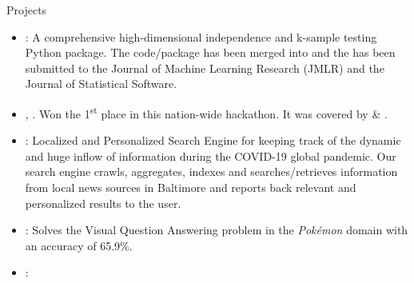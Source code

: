 \documentclass[]{mcdowellcv}
\begin{document}
	\begin{cvsection}{Projects}
		\begin{cvsubsection}{}{}{}
			\begin{itemize}
				\item \textbf{\href{https://github.com/neurodata/mgcpy}{}}: A comprehensive high-dimensional independence and k-sample testing Python package. The code/package has been merged into \href{https://github.com/scipy/scipy/pull/10524}{} and the \href{https://arxiv.org/abs/1907.02088}{} has been submitted to the Journal of Machine Learning Research (JMLR) and the Journal of Statistical Software.
				\item \textbf{\href{https://www.youtube.com/watch?v=iWw4_Ub2lPw&feature=youtu.be}{}}, \href{https://www.facebook.com/gtuoffice/videos/1786668221397028/?t=8798}{{}}. Won the 1\textsuperscript{st} place in this nation-wide hackathon. 
				It was covered by \href{https://www.thehindu.com/todays-paper/tp-national/tp-tamilnadu/5-teams-from-ssn-college-win-prizes/article23461319.ece}{{}} \& \href{https://timesofindia.indiatimes.com/city/ahmedabad/six-winners-emerge-from-smart-india-hackathon/articleshow/63561717.cms?utm_source=whatsapp&utm_medium=social&utm_campaign=TOIMobile}{{}}.
				\item \textbf{\href{https://github.com/tpsatish95/covid19-search-engine}{}}: Localized and Personalized Search Engine for keeping track of the dynamic and huge inflow of information during the COVID-19 global pandemic.  Our search engine crawls, aggregates, indexes and searches/retrieves information from local news sources in Baltimore and reports back relevant and personalized results to the user.
				\item \href{https://github.com/tpsatish95/pokemon-vqa}{}: Solves the Visual Question Answering problem in the \textit{Pokémon} domain with an accuracy of 65.9\%.
				\item \textbf{\href{https://www.youtube.com/watch?v=O-L_uSHqQvQ}{}}: 

\end{itemize}
\end{cvsubsection}
\end{cvsection}
\end{document}
